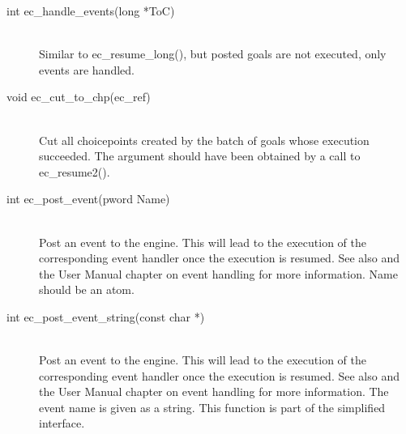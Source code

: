 \begin{description}
\item[int		ec_handle_events(long *ToC)]\ \\
	Similar to ec_resume_long(), but posted goals are not executed,
	only events are handled.

\item[void		ec_cut_to_chp(ec_ref)]\ \\
	Cut all choicepoints created by the batch of goals whose execution
	succeeded. The argument should have been obtained by a call to
	ec_resume2().

\item[int		ec_post_event(pword Name)]\ \\
	Post an event to the {\eclipse} engine. This will lead to the
	execution of the corresponding event handler once the \eclipse
	execution is resumed. See also  and the User Manual
	chapter on event handling for more information.
	Name should be an {\eclipse} atom.

\item[int		ec_post_event_string(const char *)]\ \\
	Post an event to the {\eclipse} engine. This will lead to the
	execution of the corresponding event handler once the \eclipse
	execution is resumed. See also  and the User Manual
	chapter on event handling for more information. The event name
	is given as a string.
	This function is part of the simplified interface.
\end{description}


